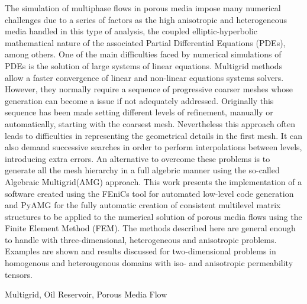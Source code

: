 The simulation of multiphase flows in porous media impose many numerical challenges due to a series of factors as the high anisotropic and heterogeneous media handled in this type of analysis, the coupled elliptic-hyperbolic mathematical nature of the associated Partial Differential Equations (PDEs),  among others. One of the main difficulties faced by numerical simulations of PDEs is the solution of large systems of linear equations. Multigrid methods allow a faster convergence of linear and non-linear equations systems solvers. However, they normally require a sequence of progressive coarser meshes whose generation can become a issue if not adequately addressed. Originally this sequence has been made setting different levels of refinement, manually or automatically, starting with the coarsest mesh. Nevertheless this approach often leads to difficulties in representing the geometrical details in the first mesh. It can also demand successive searches in order to perform interpolations between levels, introducing extra errors. An alternative to overcome these problems is to generate all the mesh hierarchy in a full algebric manner using the so-called Algebraic Multigrid(AMG) approach. This work presents the implementation of a software created using the FEniCs tool for automated low-level code generation and PyAMG for the fully automatic creation of consistent multilevel matrix structures to be applied to the numerical solution of porous media flows using the Finite Element Method (FEM). The methods described here are general enough to handle with three-dimensional, heterogeneous and anisotropic problems. Examples are shown and results discussed for two-dimensional problems in homogenous and heterougenous domains with iso- and anisotropic permeability tensors.

\begin{keywords}
Multigrid, Oil Reservoir, Porous Media Flow
\end{keywords}
